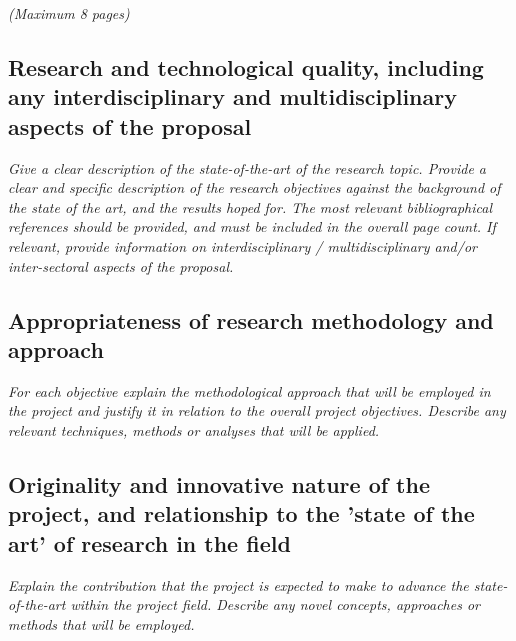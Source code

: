 \documentclass[a4paper,11pt]{article}
\newenvironment{xcomment}{\em}{}
\begin{document}
\begin{bibunit}

\begin{xcomment}  
(Maximum 8 pages)  
\end{xcomment}

\subsection{Research and technological quality, including any interdisciplinary and multidisciplinary aspects of the proposal}

\begin{xcomment}
Give a clear description of the state-of-the-art of the research topic. Provide a clear and specific
description of the research objectives against the background of the state of the art, and the
results hoped for. The most relevant bibliographical references should be provided, and must be
included in the overall page count. If relevant, provide information on interdisciplinary /
multidisciplinary and/or inter-sectoral aspects of the proposal.
\end{xcomment}

\subsection{Appropriateness of research methodology and approach}

\begin{xcomment}
For each objective explain the methodological approach that will be employed in the project and
justify it in relation to the overall project objectives. Describe any relevant techniques, methods or
analyses that will be applied.
\end{xcomment}

\subsection{Originality and innovative nature of the project, and relationship to the 'state of the art' of research in the field}

\begin{xcomment}
Explain the contribution that the project is expected to make to advance the state-of-the-art within
the project field. Describe any novel concepts, approaches or methods that will be employed.
\end{xcomment}


\end{bibunit}
\end{document}
